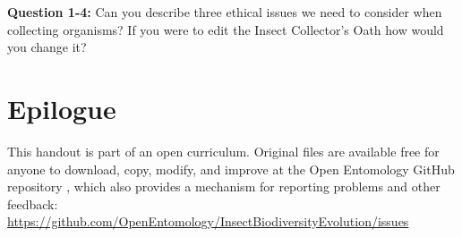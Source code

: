 \documentclass[11pt,letterpaper]{article}
\begin{document}
\noindent{}\textbf{Question 1-4:} Can you describe three ethical issues we need to consider when collecting organisms? If you were to edit the Insect Collector's Oath \citep{oath} how would you change it?\\

\section*{Epilogue}
This handout is part of an open curriculum. Original files are available free for anyone to download, copy, modify, and improve at the Open Entomology GitHub repository \citep{ENT432}, which also provides a mechanism for reporting problems and other feedback:\\
\url{https://github.com/OpenEntomology/InsectBiodiversityEvolution/issues}



\end{document}
